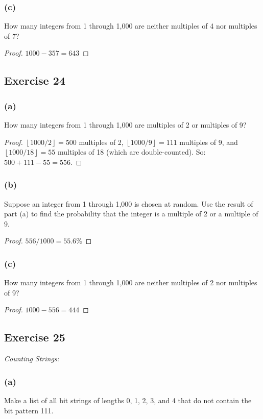 \documentclass[14pt]{extarticle}
\newcommand{\floor}[1]{{\left\lfloor#1\right\rfloor}}
\begin{document}
\subsubsection{(c)}
How many integers from 1 through 1,000 are neither multiples of 4 nor multiples of 7?

\begin{proof}
\(1000-357 = 643\)
\end{proof}

\subsection{Exercise 24}
\subsubsection{(a)}
How many integers from 1 through 1,000 are multiples of 2 or multiples of 9?

\begin{proof}
\(\floor{1000 / 2} = 500\) multiples of 2, \(\floor{1000 / 9} = 111\) multiples of 9, and \(\floor{1000 / 18} = 55\)
multiples of 18 (which are double-counted). So: \(500 + 111 - 55 = 556\).
\end{proof}

\subsubsection{(b)}
Suppose an integer from 1 through 1,000 is chosen at random. Use the result of part (a) to find the probability that the integer is a multiple of 2 or a multiple of 9.

\begin{proof}
\(556/1000=55.6\%\)
\end{proof}

\subsubsection{(c)}
How many integers from 1 through 1,000 are neither multiples of 2 nor multiples of 9?

\begin{proof}
\(1000-556=444\)
\end{proof}

\subsection{Exercise 25}
{\it Counting Strings:}

\subsubsection{(a)}
Make a list of all bit strings of lengths 0, 1, 2, 3, and 4 that do not contain the bit pattern 111.
\end{document}

